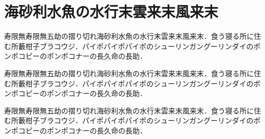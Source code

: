 \documentclass[a4j, 12Q, twocolumn, twoside]{jsarticle}
\begin{document}
\section{海砂利水魚の水行末雲来末風来末}
寿限無寿限無五劫の摺り切れ海砂利水魚の水行末雲来末風来末．食う寝る所に住む所藪柑子ブラコウジ．パイポパイポパイポのシューリンガングーリンダイのポンポコピーのポンポコナーの長久命の長助．

寿限無寿限無五劫の摺り切れ海砂利水魚の水行末雲来末風来末．食う寝る所に住む所藪柑子ブラコウジ．パイポパイポパイポのシューリンガングーリンダイのポンポコピーのポンポコナーの長久命の長助．

寿限無寿限無五劫の摺り切れ海砂利水魚の水行末雲来末風来末．食う寝る所に住む所藪柑子ブラコウジ．パイポパイポパイポのシューリンガングーリンダイのポンポコピーのポンポコナーの長久命の長助．
\end{document}
